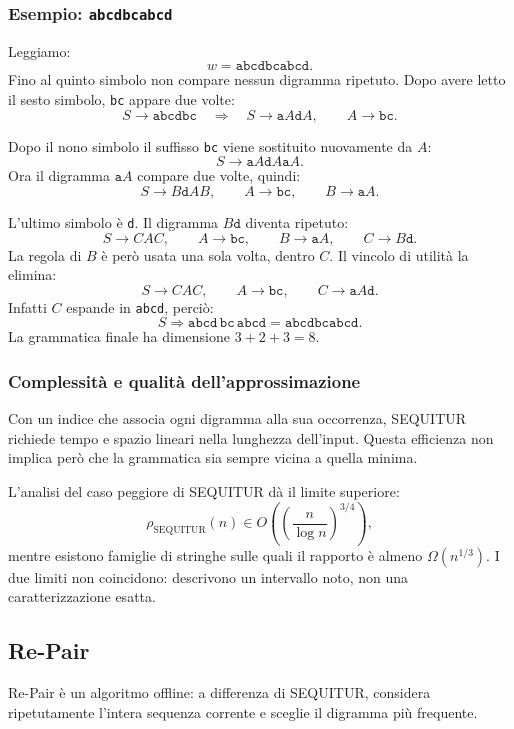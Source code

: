 \documentclass{article}
\theoremstyle{definition}
\numberwithin{equation}{section}
\begin{document}
\subsubsection{Esempio: \texttt{abcdbcabcd}}
Leggiamo:
\[
    w=\texttt{abcdbcabcd}.
\]
Fino al quinto simbolo non compare nessun digramma ripetuto. Dopo avere letto
il sesto simbolo, \texttt{bc} appare due volte:
\[
    S\to\texttt{abcdbc}
    \quad\Longrightarrow\quad
    S\to\texttt{a}A\texttt{d}A,
    \qquad
    A\to\texttt{bc}.
\]

Dopo il nono simbolo il suffisso \texttt{bc} viene sostituito nuovamente da
$A$:
\[
    S\to\texttt{a}A\texttt{d}A\texttt{a}A.
\]
Ora il digramma $\texttt{a}A$ compare due volte, quindi:
\[
    S\to B\texttt{d}AB,
    \qquad
    A\to\texttt{bc},
    \qquad
    B\to\texttt{a}A.
\]

L'ultimo simbolo è \texttt{d}. Il digramma $B\texttt{d}$ diventa ripetuto:
\[
    S\to CAC,
    \qquad
    A\to\texttt{bc},
    \qquad
    B\to\texttt{a}A,
    \qquad
    C\to B\texttt{d}.
\]
La regola di $B$ è però usata una sola volta, dentro $C$. Il vincolo di utilità
la elimina:
\[
    \boxed{
        S\to CAC,
        \qquad
        A\to\texttt{bc},
        \qquad
        C\to\texttt{a}A\texttt{d}
    }.
\]
Infatti $C$ espande in \texttt{abcd}, perciò:
\[
    S
    \Rightarrow
    \texttt{abcd}\,\texttt{bc}\,\texttt{abcd}
    =
    \texttt{abcdbcabcd}.
\]
La grammatica finale ha dimensione $3+2+3=8$.

\subsubsection{Complessità e qualità dell'approssimazione}
Con un indice che associa ogni digramma alla sua occorrenza, SEQUITUR richiede
tempo e spazio lineari nella lunghezza dell'input. Questa efficienza non implica
però che la grammatica sia sempre vicina a quella minima.

L'analisi del caso peggiore di SEQUITUR dà il limite superiore:
\[
    \rho_{\mathrm{SEQUITUR}}(n)
    \in
    O\left(
    \left(\frac{n}{\log n}\right)^{3/4}
    \right),
\]
mentre esistono famiglie di stringhe sulle quali il rapporto è almeno
$\Omega(n^{1/3})$. I due limiti non coincidono: descrivono un intervallo noto,
non una caratterizzazione esatta.

\subsection{Re-Pair}
Re-Pair è un algoritmo offline: a differenza di SEQUITUR, considera
ripetutamente l'intera sequenza corrente e sceglie il digramma più frequente.
\end{document}
